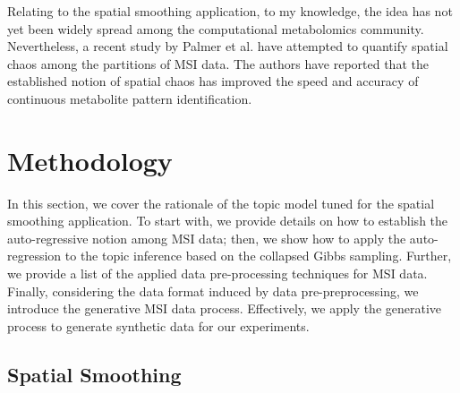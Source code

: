 \documentclass{mpaper}
\begin{document}
\par Relating to the spatial smoothing application, to my knowledge, the idea has not yet been widely spread among the computational metabolomics community. Nevertheless, a recent study by Palmer et al. \cite{palmer2016fdr} have attempted to quantify spatial chaos among the partitions of MSI data. The authors have reported that the established notion of spatial chaos has improved the speed and accuracy of continuous metabolite pattern identification. 


\section{Methodology}

\par In this section, we cover the rationale of the topic model tuned for the spatial smoothing application. To start with, we provide details on how to establish the auto-regressive notion among MSI data; then, we show how to apply the auto-regression to the topic inference based on the collapsed Gibbs sampling. Further, we provide a list of the applied data pre-processing techniques for MSI data. Finally, considering the data format induced by data pre-preprocessing, we introduce the generative MSI data process. Effectively, we apply the generative process to generate synthetic data for our experiments.

\subsection{Spatial Smoothing}
\end{document}
